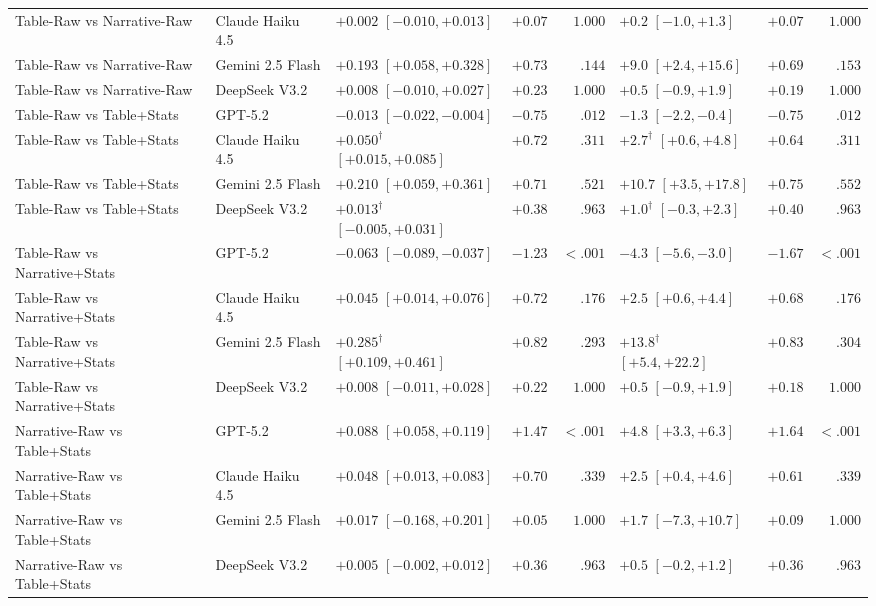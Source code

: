 \begin{table}[t]
\begin{tabular}{llp{3.1cm}rrp{3.1cm}rr}
Table-Raw vs Narrative-Raw & Claude Haiku 4.5 & $+0.002$ $[-0.010, +0.013]$ & $+0.07$ & $1.000$ & $+0.2$ $[-1.0, +1.3]$ & $+0.07$ & $1.000$ \\
Table-Raw vs Narrative-Raw & Gemini 2.5 Flash & $+0.193$ $[+0.058, +0.328]$ & $+0.73$ & $.144$ & $+9.0$ $[+2.4, +15.6]$ & $+0.69$ & $.153$ \\
Table-Raw vs Narrative-Raw & DeepSeek V3.2 & $+0.008$ $[-0.010, +0.027]$ & $+0.23$ & $1.000$ & $+0.5$ $[-0.9, +1.9]$ & $+0.19$ & $1.000$ \\
Table-Raw vs Table+Stats & GPT-5.2 & $-0.013$ $[-0.022, -0.004]$ & $-0.75$ & $.012$ & $-1.3$ $[-2.2, -0.4]$ & $-0.75$ & $.012$ \\
Table-Raw vs Table+Stats & Claude Haiku 4.5 & $+0.050^{\dagger}$ $[+0.015, +0.085]$ & $+0.72$ & $.311$ & $+2.7^{\dagger}$ $[+0.6, +4.8]$ & $+0.64$ & $.311$ \\
Table-Raw vs Table+Stats & Gemini 2.5 Flash & $+0.210$ $[+0.059, +0.361]$ & $+0.71$ & $.521$ & $+10.7$ $[+3.5, +17.8]$ & $+0.75$ & $.552$ \\
Table-Raw vs Table+Stats & DeepSeek V3.2 & $+0.013^{\dagger}$ $[-0.005, +0.031]$ & $+0.38$ & $.963$ & $+1.0^{\dagger}$ $[-0.3, +2.3]$ & $+0.40$ & $.963$ \\
Table-Raw vs Narrative+Stats & GPT-5.2 & $-0.063$ $[-0.089, -0.037]$ & $-1.23$ & $<.001$ & $-4.3$ $[-5.6, -3.0]$ & $-1.67$ & $<.001$ \\
Table-Raw vs Narrative+Stats & Claude Haiku 4.5 & $+0.045$ $[+0.014, +0.076]$ & $+0.72$ & $.176$ & $+2.5$ $[+0.6, +4.4]$ & $+0.68$ & $.176$ \\
Table-Raw vs Narrative+Stats & Gemini 2.5 Flash & $+0.285^{\dagger}$ $[+0.109, +0.461]$ & $+0.82$ & $.293$ & $+13.8^{\dagger}$ $[+5.4, +22.2]$ & $+0.83$ & $.304$ \\
Table-Raw vs Narrative+Stats & DeepSeek V3.2 & $+0.008$ $[-0.011, +0.028]$ & $+0.22$ & $1.000$ & $+0.5$ $[-0.9, +1.9]$ & $+0.18$ & $1.000$ \\
Narrative-Raw vs Table+Stats & GPT-5.2 & $+0.088$ $[+0.058, +0.119]$ & $+1.47$ & $<.001$ & $+4.8$ $[+3.3, +6.3]$ & $+1.64$ & $<.001$ \\
Narrative-Raw vs Table+Stats & Claude Haiku 4.5 & $+0.048$ $[+0.013, +0.083]$ & $+0.70$ & $.339$ & $+2.5$ $[+0.4, +4.6]$ & $+0.61$ & $.339$ \\
Narrative-Raw vs Table+Stats & Gemini 2.5 Flash & $+0.017$ $[-0.168, +0.201]$ & $+0.05$ & $1.000$ & $+1.7$ $[-7.3, +10.7]$ & $+0.09$ & $1.000$ \\
Narrative-Raw vs Table+Stats & DeepSeek V3.2 & $+0.005$ $[-0.002, +0.012]$ & $+0.36$ & $.963$ & $+0.5$ $[-0.2, +1.2]$ & $+0.36$ & $.963$ \\

\end{tabular}
\end{table}
